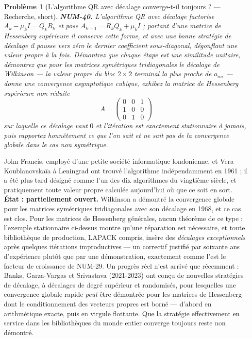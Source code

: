 \documentclass[11pt]{article}
\newtheorem{problem}{Problème}
\begin{document}
\begin{problem}[{L'algorithme QR avec décalage converge-t-il toujours ? --- Recherche, short}]
\textbf{NUM-40.} L'algorithme QR avec décalage factorise $A_k - \mu_k I = Q_k R_k$ et pose $A_{k+1} = R_k Q_k + \mu_k I$ ; partant d'une matrice de Hessenberg supérieure il conserve cette forme, et avec une bonne stratégie de décalage il pousse vers zéro le dernier coefficient sous-diagonal, dégonflant une valeur propre à la fois. Démontrez que chaque étape est une similitude unitaire, démontrez que pour les matrices symétriques tridiagonales le décalage de Wilkinson --- la valeur propre du bloc $2\times2$ terminal la plus proche de $a_{nn}$ --- donne une convergence asymptotique cubique, exhibez la matrice de Hessenberg supérieure non réduite
\[ A = \begin{pmatrix} 0 & 0 & 1 \\ 1 & 0 & 0 \\ 0 & 1 & 0 \end{pmatrix} \]
sur laquelle ce décalage vaut $0$ et l'itération est exactement stationnaire à jamais, puis rapportez honnêtement ce que l'on sait et ne sait pas de la convergence globale dans le cas non symétrique.
\end{problem}

\noindent John Francis, employé d'une petite société informatique londonienne, et Vera Koublanovskaïa à Leningrad ont trouvé l'algorithme indépendamment en 1961 ; il a été plus tard désigné comme l'un des dix algorithmes du vingtième siècle, et pratiquement toute valeur propre calculée aujourd'hui où que ce soit en sort. \textbf{État : partiellement ouvert.} Wilkinson a démontré la convergence globale pour les matrices symétriques tridiagonales avec son décalage en 1968, et ce cas est clos. Pour les matrices de Hessenberg générales, aucun théorème de ce type : l'exemple stationnaire ci-dessus montre qu'une réparation est nécessaire, et toute bibliothèque de production, LAPACK compris, insère des \textit{décalages exceptionnels} après quelques itérations improductives --- un correctif justifié par soixante ans d'expérience plutôt que par une démonstration, exactement comme l'est le facteur de croissance de NUM-29. Un progrès réel n'est arrivé que récemment : Banks, Garza-Vargas et Srivastava (2021-2023) ont conçu de nouvelles stratégies de décalage, à décalages de degré supérieur et randomisés, pour lesquelles une convergence globale rapide \textit{peut} être démontrée pour les matrices de Hessenberg dont le conditionnement des vecteurs propres est borné --- d'abord en arithmétique exacte, puis en virgule flottante. Que la stratégie effectivement en service dans les bibliothèques du monde entier converge toujours reste non démontré.
\end{document}
